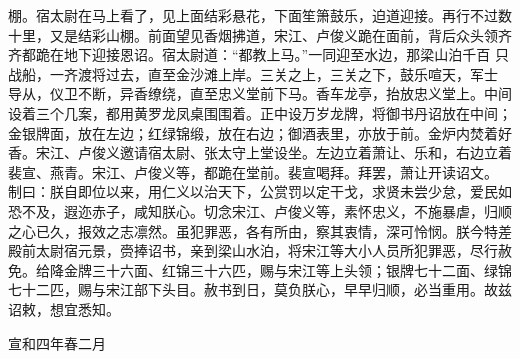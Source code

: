 棚。宿太尉在马上看了，见上面结彩悬花，下面笙箫鼓乐，迫道迎接。再行不过数
十里，又是结彩山棚。前面望见香烟拂道，宋江、卢俊义跪在面前，背后众头领齐
齐都跪在地下迎接恩诏。宿太尉道：“都教上马。”一同迎至水边，那梁山泊千百
只战船，一齐渡将过去，直至金沙滩上岸。三关之上，三关之下，鼓乐喧天，军士
导从，仪卫不断，异香缭绕，直至忠义堂前下马。香车龙亭，抬放忠义堂上。中间
设着三个几案，都用黄罗龙凤桌围围着。正中设万岁龙牌，将御书丹诏放在中间；
金银牌面，放在左边；红绿锦缎，放在右边；御酒表里，亦放于前。金炉内焚着好
香。宋江、卢俊义邀请宿太尉、张太守上堂设坐。左边立着萧让、乐和，右边立着
裴宣、燕青。宋江、卢俊义等，都跪在堂前。裴宣喝拜。拜罢，萧让开读诏文。
制曰：朕自即位以来，用仁义以治天下，公赏罚以定干戈，求贤未尝少怠，爱民如
恐不及，遐迩赤子，咸知朕心。切念宋江、卢俊义等，素怀忠义，不施暴虐，归顺
之心已久，报效之志凛然。虽犯罪恶，各有所由，察其衷情，深可怜悯。朕今特差
殿前太尉宿元景，赍捧诏书，亲到梁山水泊，将宋江等大小人员所犯罪恶，尽行赦
免。给降金牌三十六面、红锦三十六匹，赐与宋江等上头领；银牌七十二面、绿锦
七十二匹，赐与宋江部下头目。赦书到日，莫负朕心，早早归顺，必当重用。故兹
诏敕，想宜悉知。

宣和四年春二月

